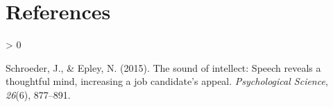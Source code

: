 \documentclass[
  english,
  man]{apa6}
\newlength{\cslhangindent}
\newenvironment{CSLReferences}[2] %
 {%
  \setlength{\parindent}{0pt}
  \ifodd #1 \everypar{\setlength{\hangindent}{\cslhangindent}}\ignorespaces\fi
  \ifnum #2 > 0
  \setlength{\parskip}{#2\baselineskip}
  \fi
 }%
 {}
\begin{document}
\newpage

\hypertarget{references}{%
\section{References}\label{references}}

\begingroup
\setlength{\parindent}{-0.5in}
\setlength{\leftskip}{0.5in}

\hypertarget{refs}{}
\begin{CSLReferences}{1}{0}
\leavevmode\hypertarget{ref-schroeder_sound_2015}{}%
Schroeder, J., \& Epley, N. (2015). The sound of intellect: Speech reveals a thoughtful mind, increasing a job candidate's appeal. \emph{Psychological Science}, \emph{26}(6), 877--891.

\end{CSLReferences}

\endgroup
\end{document}
